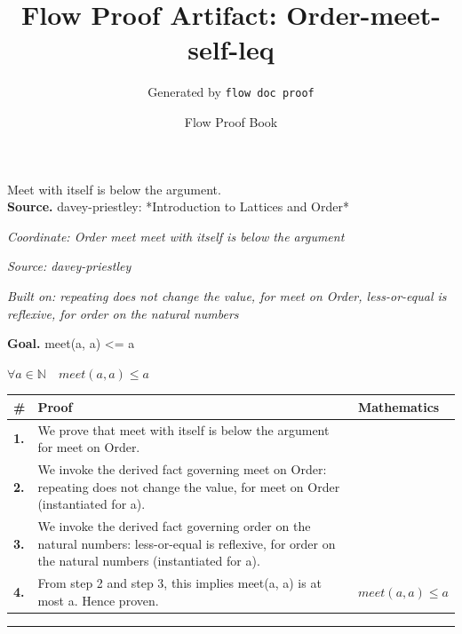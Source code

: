 \documentclass[11pt]{article}
\title{Flow Proof Artifact: Order-meet-self-leq}
\author{Generated by \texttt{flow doc proof}}
\date{Flow Proof Book}
\theoremstyle{definition}
\begin{document}
\maketitle
Meet with itself is below the argument.\\[0.5em]
\textbf{Source.} davey-priestley: *Introduction to Lattices and Order*\\[0.5em]
\bigskip
{}\par
\smallskip\noindent\textit{Coordinate: Order \cdot meet \cdot meet with itself is below the argument}\par
\smallskip\noindent\textit{Source: davey-priestley}\par
\smallskip\noindent\textit{Built on: repeating does not change the value, for meet on Order, less-or-equal is reflexive, for order on the natural numbers}\par
\medskip
\noindent\textbf{Goal.} meet(a, a) <= a\par
\noindent$\displaystyle \forall a \in \mathbb{N}\quad meet(a, a) \le a$\par
\medskip
\noindent
\begin{tabular}{@{} >{\raggedright\arraybackslash}p{} >{\raggedright\arraybackslash}p{} >{\raggedleft\arraybackslash}p{} @{}}
\textbf{\#} & \textbf{Proof} & \textbf{Mathematics} \\
\midrule
\textbf{1.} & We prove that meet with itself is below the argument for meet on Order. & \\[0.45em]
\textbf{2.} & We invoke the derived fact governing meet on Order: repeating does not change the value, for meet on Order (instantiated for a). & \\[0.45em]
\textbf{3.} & We invoke the derived fact governing order on the natural numbers: less-or-equal is reflexive, for order on the natural numbers (instantiated for a). & \\[0.45em]
\textbf{4.} & From step 2 and step 3, this implies meet(a, a) is at most a. Hence proven. & $\displaystyle meet(a, a) \le a$ \\[0.45em]
\bottomrule
\end{tabular}
\label{thm:Order-meet-meet_with_itself_is_below_the_argument}
\par\medskip\hrule
\end{document}
